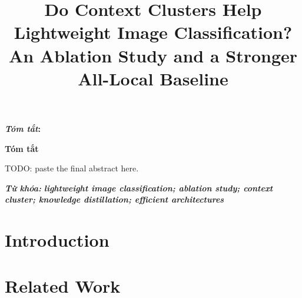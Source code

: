 \documentclass[9pt, conference, a4paper, compsocconf]{IEEEtran}
\makeatletter
\renewenvironment{abstract}
  {\normalfont
   \@IEEEabskeysecsize
   \setlength{\parindent}{0pt}
   \noindent
   \if@twocolumn
     \bfseries\textit{\abstractname}:
   \else
     \begin{center}\textbf{\abstractname}\end{center}
   \fi}
  {\par}
\renewenvironment{IEEEkeywords}
  {\normalfont
   \@IEEEabskeysecsize
   \vspace{0.3em}
   \setlength{\parindent}{0pt}
   \noindent
   {\bfseries\itshape \IEEEkeywordsname: }\ignorespaces}
  {\par}
\renewcommand{\abstractname}{Tóm tắt}
\renewcommand{\IEEEkeywordsname}{Từ khóa}
\makeatother
\begin{document}
\fontsize{9}{10}
\selectfont


\title{Do Context Clusters Help Lightweight Image Classification?\\ An Ablation Study and a Stronger All-Local Baseline}

\author{
}

\maketitle

\begin{abstract}
TODO: paste the final abstract here.
\end{abstract}

\begin{IEEEkeywords}
\textbf{\textit{lightweight image classification; ablation study; context cluster; knowledge distillation; efficient architectures}}
\end{IEEEkeywords}

\IEEEpeerreviewmaketitle

\section{Introduction}
\label{sec:intro}

\section{Related Work}
\label{sec:related}
\end{document}
